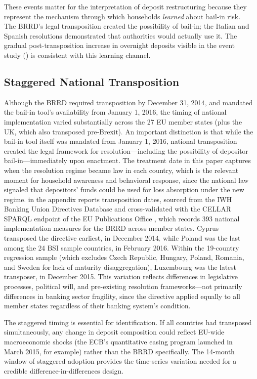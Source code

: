 \documentclass[12pt]{article}
\begin{document}
These events matter for the interpretation of deposit restructuring because they represent the mechanism through which households \textit{learned} about bail-in risk. The BRRD's legal transposition created the possibility of bail-in; the Italian and Spanish resolutions demonstrated that authorities would actually use it. The gradual post-transposition increase in overnight deposits visible in the event study () is consistent with this learning channel.

\subsection{Staggered National Transposition}

Although the BRRD required transposition by December 31, 2014, and mandated the bail-in tool's availability from January 1, 2016, the timing of national implementation varied substantially across the 27 EU member states (plus the UK, which also transposed pre-Brexit). An important distinction is that while the bail-in tool itself was mandated from January 1, 2016, national transposition created the legal framework for resolution---including the possibility of depositor bail-in---immediately upon enactment. The treatment date in this paper captures when the resolution regime became law in each country, which is the relevant moment for household awareness and behavioral response, since the national law signaled that depositors' funds could be used for loss absorption under the new regime.  in the appendix reports transposition dates, sourced from the IWH Banking Union Directives Database \citep{deroth2022iwh} and cross-validated with the CELLAR SPARQL endpoint of the EU Publications Office \citep{cellar2024}, which records 393 national implementation measures for the BRRD across member states. Cyprus transposed the directive earliest, in December 2014, while Poland was the last among the 24 BSI sample countries, in February 2016. Within the 19-country regression sample (which excludes Czech Republic, Hungary, Poland, Romania, and Sweden for lack of maturity disaggregation), Luxembourg was the latest transposer, in December 2015. This variation reflects differences in legislative processes, political will, and pre-existing resolution frameworks---not primarily differences in banking sector fragility, since the directive applied equally to all member states regardless of their banking system's condition.

The staggered timing is essential for identification. If all countries had transposed simultaneously, any change in deposit composition could reflect EU-wide macroeconomic shocks (the ECB's quantitative easing program launched in March 2015, for example) rather than the BRRD specifically. The 14-month window of staggered adoption provides the time-series variation needed for a credible difference-in-differences design.
\end{document}
